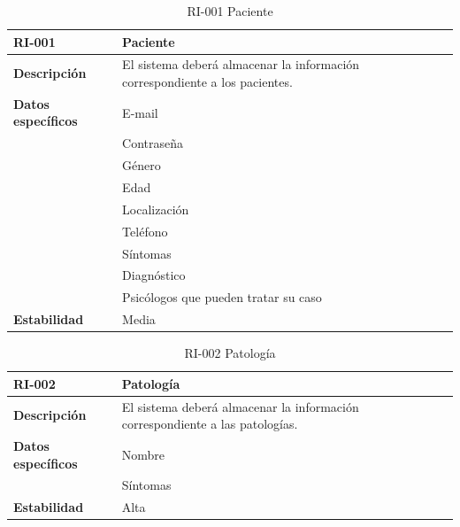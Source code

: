\begin{table}[htpb]
\centering
\begin{tabularx}{\textwidth}{|l|X|}
\hline
\rowcolor[gray]{0.9}\textbf{RI-001}            & \textbf{Paciente}                                                                       \\ \hline
\textbf{Descripción}       & El sistema deberá almacenar la información correspondiente a los pacientes.    \\ \hline
\textbf{Datos específicos} & E-mail                                                                         \\ 
\multirow{8}{*}{} & Contraseña                                                                     \\ 
                  & Género                                                                         \\ 
                  & Edad                                                                           \\ 
                  & Localización                                                                   \\ 
                  & Teléfono                                                                       \\  
                  & Síntomas                                                                       \\ 
                  & Diagnóstico                                                                    \\  
                  & Psicólogos que pueden tratar su caso \\ \hline
\textbf{Estabilidad}       & Media                                                                          \\ \hline
\end{tabularx}
\caption{RI-001 Paciente}
\end{table}


\begin{table}[htpb]
\centering
\begin{tabularx}{\textwidth}{|l|X|}
\hline
\rowcolor[gray]{0.9}\textbf{RI-002}            & \textbf{Patología                                                                   } \\ \hline
\textbf{Descripción}       & El sistema deberá almacenar la información correspondiente a las patologías. \\ \hline
\textbf{Datos específicos} & Nombre                                                                       \\ 
                  & Síntomas                                                                     \\ \hline
\textbf{Estabilidad}       & Alta                                                                         \\ \hline
\end{tabularx}
\caption{RI-002 Patología}
\end{table}


